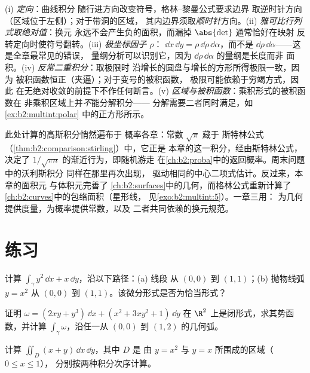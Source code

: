 \begin{remark}[常见易错点]
(i) \emph{定向}：曲线积分
随行进方向改变符号，格林--黎曼公式要求边界
取逆时针方向（区域位于左侧）；对于带洞的区域，
其内边界须取\emph{顺时针}方向。(ii)
\emph{雅可比行列式取绝对值}：换元
永远不会产生负的面积，而漏掉
$\abs{\det}$ 通常恰好在映射
反转定向时使符号翻转。(iii) \emph{极坐标因子 $\rho$}：
$\dd x\,\dd y = \rho\,\dd\rho\,\dd\alpha$，而不是
$\dd\rho\,\dd\alpha$——这是全章最常见的错误，
量纲分析可以识别它，因为
$\dd\rho\,\dd\alpha$ 的量纲是长度而非
面积。(iv) \emph{反常二重积分}：取极限时
沿增长的圆盘与增长的方形所得极限一致，因为
被积函数恒正（夹逼）；对于变号的被积函数，
极限可能依赖于穷竭方式，因此
在无绝对收敛的前提下不作任何断言。(v)
\emph{区域与被积函数}：乘积形式的被积函数在
非乘积区域上并\emph{不}能分解积分——
分解需要二者同时满足，如\cref{ex:b2:multint:polar}
中的正方形所示。
\end{remark}

\begin{remark}[本册内的几个视角]
此处计算的高斯积分悄然遍布于
概率各章：常数 $\sqrt\pi$ 藏于
斯特林公式（\cref{thm:b2:comparison:stirling}）中，它正是
本章的这一积分，经由斯特林公式，决定了
$1/\sqrt{\pi n}$ 的渐近行为，即随机游走
在\cref{ch:b2:proba}中的返回概率。周末问题中的沃利斯积分
同样在那里再次出现，
驱动相同的中心二项式估计。反过来，本章的面积元
与体积元完善了
\cref{ch:b2:surfaces}中的几何，而格林公式重新计算了
\cref{ch:b2:curves}中的包络面积（星形线，
见\cref{exo:b2:multint:5}）。一章三用：
为几何提供度量，为概率提供常数，以及
二者共同依赖的换元规范。
\end{remark}

\section{练习}

\begin{exercise}[$\star$]\label{exo:b2:multint:1}
计算 $\int_\gamma y^2\,\dd x + x\,\dd y$，沿以下路径：(a) 线段
从 $(0,0)$ 到 $(1,1)$；(b) 抛物线弧 $y = x^2$ 从
$(0,0)$ 到 $(1,1)$。该微分形式是否为恰当形式？
\end{exercise}

\begin{exercise}[$\star$]\label{exo:b2:multint:2}
证明 $\omega = (2xy + y^3)\,\dd x + (x^2 + 3xy^2 + 1)\,\dd y$
在 $\R^2$ 上是闭形式，求其势函数，并计算
$\int_\gamma\omega$，沿任一从 $(0, 0)$ 到 $(1, 2)$ 的几何弧。
\end{exercise}

\begin{exercise}[$\star$]\label{exo:b2:multint:3}
计算 $\iint_D (x + y)\,\dd x\,\dd y$，其中 $D$ 是
由 $y = x^2$ 与 $y = x$ 所围成的区域（$0 \leq x \leq 1$），
分别按两种积分次序计算。
\end{exercise}

